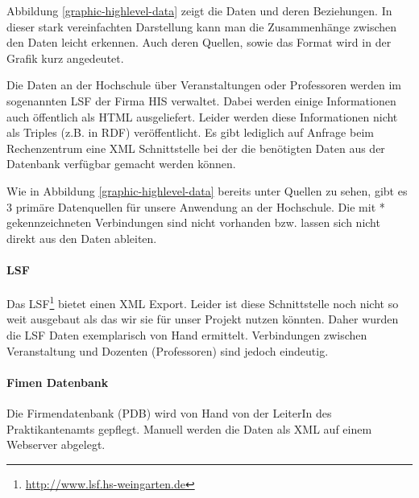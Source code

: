 Abbildung \ref{graphic-highlevel-data} zeigt die Daten und deren Beziehungen. In dieser stark vereinfachten Darstellung kann man die Zusammenhänge zwischen den Daten leicht erkennen. Auch deren Quellen, sowie das Format wird in der Grafik kurz angedeutet.

Die Daten an der Hochschule über Veranstaltungen oder Professoren werden im sogenannten \gls{LSF} der Firma HIS verwaltet. Dabei werden einige Informationen auch öffentlich als HTML ausgeliefert. Leider werden diese Informationen nicht als Triples (z.B. in RDF) veröffentlicht. Es gibt lediglich auf Anfrage beim Rechenzentrum eine XML Schnittstelle bei der die benötigten Daten aus der Datenbank verfügbar gemacht werden können.


Wie in Abbildung \ref{graphic-highlevel-data} bereits unter Quellen zu sehen, gibt es 3 primäre Datenquellen für unsere Anwendung an der Hochschule. Die mit * gekennzeichneten Verbindungen sind nicht vorhanden bzw. lassen sich nicht direkt aus den Daten ableiten.

\paragraph{LSF} Das LSF\footnote{\url{http://www.lsf.hs-weingarten.de}} bietet einen XML Export. Leider ist diese Schnittstelle noch nicht so weit ausgebaut als das wir sie für unser Projekt nutzen könnten. Daher wurden die LSF Daten exemplarisch von Hand ermittelt. Verbindungen zwischen Veranstaltung und Dozenten (Professoren) sind jedoch eindeutig.

\paragraph{Fimen Datenbank} Die Firmendatenbank (PDB) wird von Hand von der LeiterIn des Praktikantenamts gepflegt. Manuell werden die Daten als XML auf einem Webserver abgelegt.

